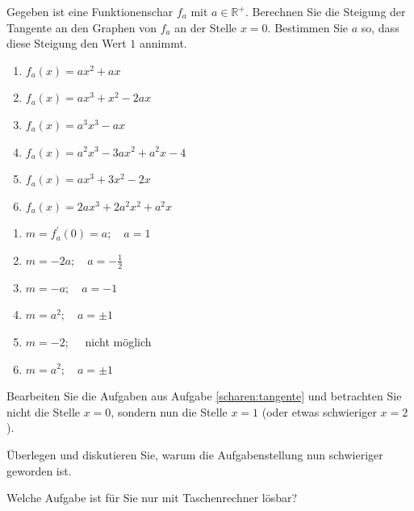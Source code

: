 \documentclass[12pt,a4paper,twoside,fleqn]{article}
\begin{document}
\begin{question}\label{scharen:tangente}
  
  Gegeben ist eine Funktionenschar $f_a$ mit $a\in\mathbb{R}^+$.
  Berechnen Sie die Steigung der Tangente an den Graphen von $f_a$ an
  der Stelle $x=0$. Bestimmen Sie $a$ so, dass diese Steigung den Wert
  $1$ annimmt.  
  \begin{multicols}{2}
    \begin{enumerate}
    \item $f_a(x)=ax^2+ax$
    \item $f_a(x)=ax^3+x^2-2ax$
    \item $f_a(x)=a^3x^3- ax$
    \item $f_a(x)=a^2x^3-3ax^2+a^2x-4$
    \item $f_a(x)=ax^3+3x^2-2x$
    \item $f_a(x)=2ax^3+2a^2x^2+a^2x$
    \end{enumerate}
  \end{multicols}
\end{question}
\begin{solution}
  \begin{multicols}{3}
    \begin{enumerate}
    \item $m=f^\prime_a(0)=a;\quad a=1$
    \item $m=-2a;\quad a=- \frac 1 2$
    \item $m=-a;\quad a=-1$
    \item $m=a^2;\quad a=\pm 1$
    \item $m=-2;\quad$ nicht möglich
    \item $m=a^2;\quad a=\pm 1$
    \end{enumerate}
  \end{multicols}
\end{solution}

\begin{question}
  
Bearbeiten Sie die Aufgaben aus Aufgabe \ref{scharen:tangente} und betrachten
Sie nicht die Stelle $x=0$, sondern nun die Stelle $x=1$ (oder etwas
schwieriger $x=2$).

Überlegen und diskutieren Sie, warum die Aufgabenstellung nun
schwieriger geworden ist. 

Welche Aufgabe ist für Sie nur mit Taschenrechner lösbar? 
\end{question}
\end{document}
